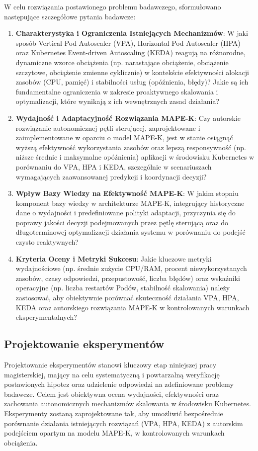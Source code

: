 W celu rozwiązania postawionego problemu badawczego, sformułowano następujące szczegółowe pytania badawcze:
\begin{enumerate}
    \item \textbf{Charakterystyka i Ograniczenia Istniejących Mechanizmów}: W jaki sposób Vertical Pod Autoscaler (VPA), Horizontal Pod Autoscaler (HPA) oraz Kubernetes Event-driven Autoscaling (KEDA) reagują na różnorodne, dynamiczne wzorce obciążenia (np. narastające obciążenie, obciążenie szczytowe, obciążenie zmienne cyklicznie) w kontekście efektywności alokacji zasobów (CPU, pamięć) i stabilności usług (opóźnienia, błędy)? Jakie są ich fundamentalne ograniczenia w zakresie proaktywnego skalowania i optymalizacji, które wynikają z ich wewnętrznych zasad działania?
    \item \textbf{Wydajność i Adaptacyjność Rozwiązania MAPE-K}: Czy autorskie rozwiązanie autonomicznej pętli sterującej, zaprojektowane i zaimplementowane w oparciu o model MAPE-K, jest w stanie osiągnąć wyższą efektywność wykorzystania zasobów oraz lepszą responsywność (np. niższe średnie i maksymalne opóźnienia) aplikacji w środowisku Kubernetes w porównaniu do VPA, HPA i KEDA, szczególnie w scenariuszach wymagających zaawansowanej predykcji i koordynacji decyzji?
    \item \textbf{Wpływ Bazy Wiedzy na Efektywność MAPE-K}: W jakim stopniu komponent bazy wiedzy w architekturze MAPE-K, integrujący historyczne dane o wydajności i predefiniowane polityki adaptacji, przyczynia się do poprawy jakości decyzji podejmowanych przez pętlę sterującą oraz do długoterminowej optymalizacji działania systemu w porównaniu do podejść czysto reaktywnych?
    \item \textbf{Kryteria Oceny i Metryki Sukcesu}: Jakie kluczowe metryki wydajnościowe (np. średnie zużycie CPU/RAM, procent niewykorzystanych zasobów, czasy odpowiedzi, przepustowość, liczba błędów) oraz wskaźniki operacyjne (np. liczba restartów Podów, stabilność skalowania) należy zastosować, aby obiektywnie porównać skuteczność działania VPA, HPA, KEDA oraz autorskiego rozwiązania MAPE-K w kontrolowanych warunkach eksperymentalnych?
\end{enumerate}

\subsection{Projektowanie eksperymentów}
Projektowanie eksperymentów stanowi kluczowy etap niniejszej pracy magisterskiej, mający na celu systematyczną i powtarzalną weryfikację postawionych hipotez oraz udzielenie odpowiedzi na zdefiniowane problemy badawcze. Celem jest obiektywna ocena wydajności, efektywności oraz zachowania autonomicznych mechanizmów skalowania w środowisku Kubernetes. Eksperymenty zostaną zaprojektowane tak, aby umożliwić bezpośrednie porównanie działania istniejących rozwiązań (VPA, HPA, KEDA) z autorskim podejściem opartym na modelu MAPE-K, w kontrolowanych warunkach obciążenia.

